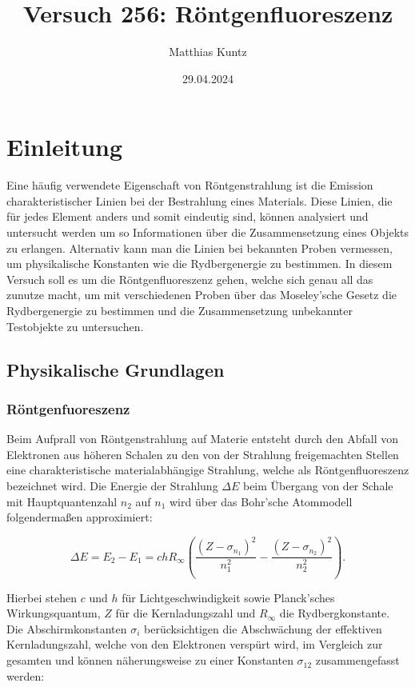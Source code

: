 \documentclass{article}
\title{Versuch 256: Röntgenfluoreszenz}
\author{Matthias Kuntz}
\date{29.04.2024}
\begin{document}
\maketitle

\tableofcontents

\newpage

\section{Einleitung}

Eine häufig verwendete Eigenschaft von Röntgenstrahlung ist die Emission charakteristischer Linien bei der Bestrahlung eines Materials. Diese Linien, die für jedes Element anders und somit eindeutig sind, können analysiert und untersucht werden um so Informationen über die Zusammensetzung eines Objekts zu erlangen. Alternativ kann man die Linien bei bekannten Proben vermessen, um physikalische Konstanten wie die Rydbergenergie zu bestimmen. In diesem Versuch soll es um die Röntgenfluoreszenz gehen, welche sich genau all das zunutze macht, um mit verschiedenen Proben über das Moseley'sche Gesetz die Rydbergenergie zu bestimmen und die Zusammensetzung unbekannter Testobjekte zu untersuchen.  

\subsection{Physikalische Grundlagen}

\subsubsection{Röntgenfuoreszenz}

Beim Aufprall von Röntgenstrahlung auf Materie entsteht durch den Abfall von Elektronen aus höheren Schalen zu den von der Strahlung freigemachten Stellen eine charakteristische materialabhängige Strahlung, welche als Röntgenfluoreszenz bezeichnet wird. Die Energie der Strahlung $\Delta E$ beim Übergang von der Schale mit Hauptquantenzahl $n_2$ auf $n_1$ wird über das Bohr'sche Atommodell folgendermaßen approximiert:

\begin{equation}
    \Delta E = E_2 - E_1 = ch R_\infty \left( \frac{(Z - \sigma_{n_1})^2}{n_1^2} - \frac{(Z - \sigma_{n_2})^2}{n_2^2} \right).
\end{equation}

Hierbei stehen $c$ und $h$ für Lichtgeschwindigkeit sowie Planck'sches Wirkungsquantum, $Z$ für die Kernladungszahl und $R_\infty$ die Rydbergkonstante. Die Abschirmkonstanten $\sigma_i$ berücksichtigen die Abschwächung der effektiven Kernladungszahl, welche von den Elektronen verspürt wird, im Vergleich zur gesamten und können näherungsweise zu einer Konstanten $\sigma_{12}$ zusammengefasst werden:
\end{document}
